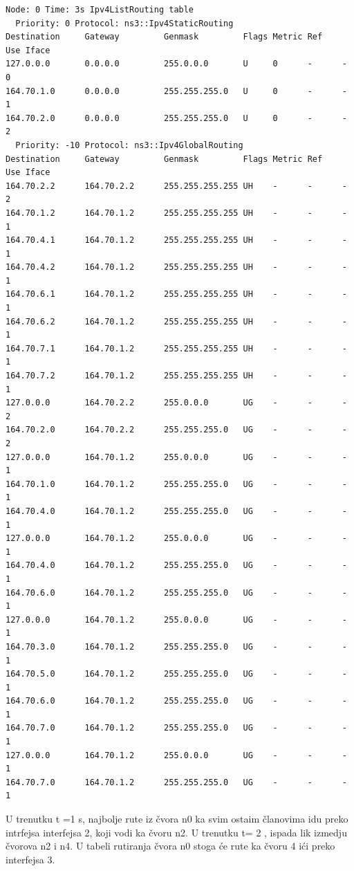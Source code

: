 \documentclass[a4paper,12pt, Projekat]{etf}
\begin{document}
\begin{itemize}
\begin{verbatim}
Node: 0 Time: 3s Ipv4ListRouting table
  Priority: 0 Protocol: ns3::Ipv4StaticRouting
Destination     Gateway         Genmask         Flags Metric Ref    Use Iface
127.0.0.0       0.0.0.0         255.0.0.0       U     0      -      -   0
164.70.1.0      0.0.0.0         255.255.255.0   U     0      -      -   1
164.70.2.0      0.0.0.0         255.255.255.0   U     0      -      -   2
  Priority: -10 Protocol: ns3::Ipv4GlobalRouting
Destination     Gateway         Genmask         Flags Metric Ref    Use Iface
164.70.2.2      164.70.2.2      255.255.255.255 UH    -      -      -   2
164.70.1.2      164.70.1.2      255.255.255.255 UH    -      -      -   1
164.70.4.1      164.70.1.2      255.255.255.255 UH    -      -      -   1
164.70.4.2      164.70.1.2      255.255.255.255 UH    -      -      -   1
164.70.6.1      164.70.1.2      255.255.255.255 UH    -      -      -   1
164.70.6.2      164.70.1.2      255.255.255.255 UH    -      -      -   1
164.70.7.1      164.70.1.2      255.255.255.255 UH    -      -      -   1
164.70.7.2      164.70.1.2      255.255.255.255 UH    -      -      -   1
127.0.0.0       164.70.2.2      255.0.0.0       UG    -      -      -   2
164.70.2.0      164.70.2.2      255.255.255.0   UG    -      -      -   2
127.0.0.0       164.70.1.2      255.0.0.0       UG    -      -      -   1
164.70.1.0      164.70.1.2      255.255.255.0   UG    -      -      -   1
164.70.4.0      164.70.1.2      255.255.255.0   UG    -      -      -   1
127.0.0.0       164.70.1.2      255.0.0.0       UG    -      -      -   1
164.70.4.0      164.70.1.2      255.255.255.0   UG    -      -      -   1
164.70.6.0      164.70.1.2      255.255.255.0   UG    -      -      -   1
127.0.0.0       164.70.1.2      255.0.0.0       UG    -      -      -   1
164.70.3.0      164.70.1.2      255.255.255.0   UG    -      -      -   1
164.70.5.0      164.70.1.2      255.255.255.0   UG    -      -      -   1
164.70.6.0      164.70.1.2      255.255.255.0   UG    -      -      -   1
164.70.7.0      164.70.1.2      255.255.255.0   UG    -      -      -   1
127.0.0.0       164.70.1.2      255.0.0.0       UG    -      -      -   1
164.70.7.0      164.70.1.2      255.255.255.0   UG    -      -      -   1

\end{verbatim}
U trenutku
t =1 s, najbolje  rute iz \v cvora n0 ka svim ostaim \v clanovima idu preko intrfejsa 
interfejsa 2, koji vodi ka \v cvoru n2. U trenutku t= 2 , ispada lik izmedju \v cvorova n2 i n4. U tabeli rutiranja \v cvora n0 stoga \' ce rute ka \v cvoru 4 i\' ci preko interfejsa 3.


\end{itemize}
\end{document}
